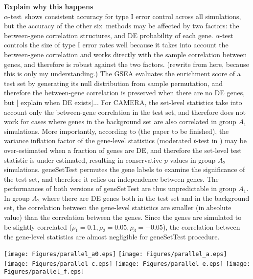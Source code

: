 \documentclass[useAMS,usenatbib, galley]{biom}
\newcommand{\OurMethod}{$\alpha$-test}
\newcommand{\HowmanyTest}{six}
\newcommand{\aaCase}{a}
\newcommand{\fCase}{e}
\begin{document}
	
	\textbf{Explain why this happens}\\
	\OurMethod~shows consistent accuracy for type I error control across all simulations, but the accuracy of the other \HowmanyTest~methods may be affected by two factors: the between-gene correlation structures, and DE probability of each gene. \OurMethod~ controls the size of type I error rates well because it takes into account the between-gene correlation and works directly with the sample correlation between genes, and therefore is robust against the two factors. (rewrite from here, because this is only my understanding.)  The GSEA evaluates the enrichment score of a test set by generating its null distribution from sample permutation, and therefore the between-gene correlation is preserved when there are no DE genes, but [ explain when DE exists]... 
	For CAMERA, the set-level statistics take into account only the between-gene correlation in the test set, and therefore does not work for cases where genes in the background set are also correlated in group $A_1$ simulations. More importantly, according to (the paper to be finished), the variance inflation factor of the gene-level statistics (moderated $t$-test in \cite{wu2012camera}) may be over-estimated when a fraction of genes are DE, and therefore the set-level test statistic is under-estimated, resulting in conservative $p$-values in group $A_2$ simulations. geneSetTest permutes the gene labels to examine the significance of the test set, and therefore it relies on independence between genes. The performances of both versions of geneSetTest are thus unpredictable in group $A_1$. In group $A_2$ where there are DE genes both in the test set and in the background set, the correlation between the gene-level statistics are smaller (in absolute value) than the correlation between the genes. Since the genes are simulated to be slightly correlated ($\rho_1=0.1, \rho_2 = 0.05, \rho_3 = -0.05$), the correlation between the gene-level statistics are almost negligible for geneSetTest procedure. 
	
	
	\begin{figure*}
		\begin{center}
			\texttt{[image: Figures/parallel\_a0.eps]}
			\texttt{[image: Figures/parallel\_a.eps]}
			\texttt{[image: Figures/parallel\_c.eps]}
			\texttt{[image: Figures/parallel\_e.eps]}
			\texttt{[image: Figures/parallel\_f.eps]}
		\end{center} 
	\caption{Type I error rates for gene set tests, $p$-value distribution for case (\aaCase) - (\fCase) from left to right, from top to bottom, NO gene is DE}\label{fig:typeIerror}
	\end{figure*} 
\end{document}
